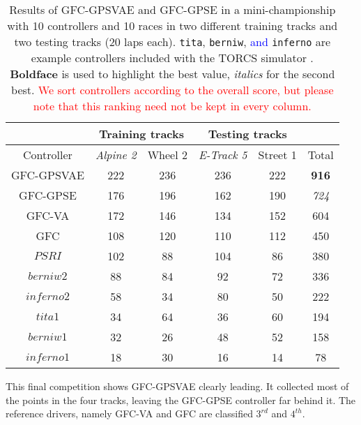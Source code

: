 \documentclass[10pt,journal,compsoc]{IEEEtran}
\begin{document}
\begin{table}[ht]
  \centering
  {\scriptsize
    \caption{ Results of {\sf GFC-GPSVAE} and {\sf GFC-GPSE}
      in a mini-championship with 10 controllers
      and 10 races in two different training tracks and two testing tracks (20 laps each). {\tt tita}, {\tt berniw}, \textcolor{blue}{and} {\tt inferno} are example controllers included with the TORCS
      simulator \cite{torcs4}.  {\bf Boldface} is used to highlight
      the best value, {\em italics} for the second
      best. \textcolor{red}{We sort controllers according to the
        overall score, but please note that this ranking need not be
        kept in every column.}}
    {
            \begin{tabular}{|c|c|c|c|c||c|}
	\hline
	& \multicolumn{2}{|c|}{Training tracks} &\multicolumn{2}{|c|}{Testing tracks} \\
	\hline
	Controller&\textit{Alpine 2} &Wheel 2&\textit{E-Track 5}  &Street 1&Total\\
        \hline
        \hline



{\sf GFC-GPSVAE}	&222&236&236&222&	{\bf 916}\\
{\sf GFC-GPSE}	&176&196&162&190&{\em 724}\\

{\sf GFC-VA} \cite{DBLP:conf/cig/SalemMG19}&172&146&	134&152& 604\\
{\sf GFC}  \cite{salem_cig2018}	&108&	120&110&	112&	450\\
$PSRI$\cite{PerezEvolvingFuzzy09}&102&88 &104&86 &380\\
$berniw2$		&88	&84 &92 &72 &336\\
$inferno2$	&58	&34 &80 &50 &222\\
$tita1$		&34 &64 &36 &60 &194\\
$berniw1$		&32	&26 &48 &52 &158\\
$inferno1$	&18	&30 &16 &14 &78\\
\hline

\end{tabular}
}\label{tab:allsresults}
}
\end{table}




This final competition shows {\sf GFC-GPSVAE} clearly leading. It
collected most of the points in the four tracks, leaving the {\sf
  GFC-GPSE} controller far behind it. The reference drivers, namely
{\sf GFC-VA} and {\sf GFC}  are classified $3^{rd}$ and $4^{th}$.
\end{document}
